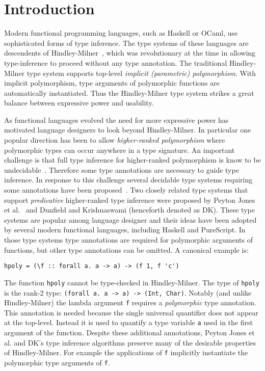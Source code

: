 \section{Introduction}

Modern functional programming languages, such as Haskell or OCaml,
use sophisticated forms of type inference. The type systems of these languages are
descendents of Hindley-Milner~\cite{}, which was revolutionary at the
time in allowing type-inference to proceed without any type
annotation. The traditional Hindley-Milner type system supports
top-level \emph{implicit (parametric) polymorphism}. With implicit
polymorphism, type arguments of polymorphic functions are
automatically instantiated. Thus the Hindley-Milner type system 
strikes a great balance between expressive power and usability. 

As functional languages evolved the need for more expressive
power has motivated language designers to look beyond Hindley-Milner.
In particular one popular direction has been to allow 
\emph{higher-ranked polymorphism} where polymorphic types can
occur anywhere in a type signature.  
An important challenge is that full type inference for higher-ranked
polymorphism is know to be undecidable~\cite{}. Therefore some type
annotations are necessary to guide type inference. In response to this 
challenge several decidable type systems requiring some annotations 
have been proposed~\cite{}. Two closely related type systems that 
support \emph{predicative} higher-ranked type inference were proposed 
by Peyton Jones et al.~\cite{} and Dunfield and
Krishnaswami (henceforth denoted as DK). 
These type systems are
popular among language designer and their ideas have been adopted by
several modern functional languages, including Haskell and PureScript.
In those type systems
type annotations are required for polymorphic arguments of functions,
but other type annotations can be omitted. A canonical example is:
\begin{verbatim}
hpoly = (\f :: forall a. a -> a) -> (f 1, f 'c')
\end{verbatim}
The function \verb|hpoly| cannot be
type-checked in Hindley-Milner.  The type of \verb|hpoly| is the rank-2 type:
\verb|(forall a. a -> a) -> (Int, Char)|. Notably (and unlike
Hindley-Milner) the lambda argument \verb|f| requires a
\emph{polymorphic} type annotation.
This annotation is needed because the single universal quantifier
does not appear at the top-level. Instead it is used to quantify a
type variable \verb|a| used in the first argument of the
function. 
Despite these additional annotations, Peyton Jones et al. and DK's
type inference algorithms preserve many of the desirable properties 
of Hindley-Milner. For example the applications of \verb|f| implicitly 
instantiate the polymorphic type arguments of \verb|f|.

